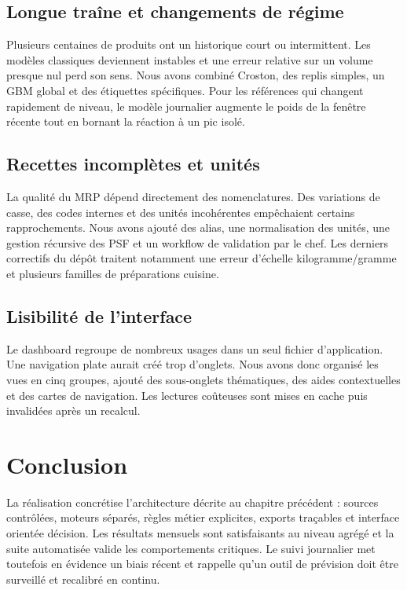 \subsection{Longue traîne et changements de régime}

Plusieurs centaines de produits ont un historique court ou intermittent. Les
modèles classiques deviennent instables et une erreur relative sur un volume
presque nul perd son sens. Nous avons combiné Croston, des replis simples, un GBM
global et des étiquettes spécifiques. Pour les références qui changent rapidement
de niveau, le modèle journalier augmente le poids de la fenêtre récente tout en
bornant la réaction à un pic isolé.

\subsection{Recettes incomplètes et unités}

La qualité du MRP dépend directement des nomenclatures. Des variations de casse,
des codes internes et des unités incohérentes empêchaient certains rapprochements.
Nous avons ajouté des alias, une normalisation des unités, une gestion récursive
des PSF et un workflow de validation par le chef. Les derniers correctifs du dépôt
traitent notamment une erreur d'échelle kilogramme/gramme et plusieurs familles de
préparations cuisine.

\subsection{Lisibilité de l'interface}

Le dashboard regroupe de nombreux usages dans un seul fichier d'application. Une
navigation plate aurait créé trop d'onglets. Nous avons donc organisé les vues en
cinq groupes, ajouté des sous-onglets thématiques, des aides contextuelles et des
cartes de navigation. Les lectures coûteuses sont mises en cache puis invalidées
après un recalcul.

\section{Conclusion}

La réalisation concrétise l'architecture décrite au chapitre précédent : sources
contrôlées, moteurs séparés, règles métier explicites, exports traçables et
interface orientée décision. Les résultats mensuels sont satisfaisants au niveau
agrégé et la suite automatisée valide les comportements critiques. Le suivi
journalier met toutefois en évidence un biais récent et rappelle qu'un outil de
prévision doit être surveillé et recalibré en continu.
